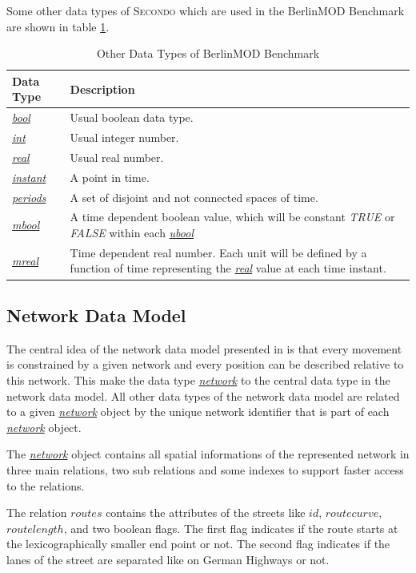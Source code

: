 \documentclass[a4paper]{article}
\newcommand{\secondo}{\textsc{Secondo}}
\newcommand{\bmodb} {BerlinMOD Benchmark}
\newcommand{\dt}[1]{\textsl{\underline{#1}}}
\newcommand{\true}{\textsl{TRUE}}
\newcommand{\false}{\textsl{FALSE}}
\begin{document}
Some other data types of \secondo{} which are used in the \bmodb{} are shown in
table \ref{tab:bmodbdatatypes}.
\begin{table}[H]
\begin{center}
\begin{scriptsize}
\begin{tabularx}{\textwidth}{|l|X|}
\hline
\textbf{Data Type} & \textbf{Description} \\
\hline
\dt{bool} & Usual boolean data type.\\
\hline
\dt{int} & Usual integer number.\\
\hline
\dt{real} & Usual real number.\\
\hline
\dt{instant} & A point in time.\\
\hline
\dt{periods} & A set of disjoint and not connected spaces of time.\\
\hline
\dt{mbool} & A time dependent boolean value, which will be constant \true{} or \false{}
within each \dt{ubool} \\
\hline
\dt{mreal} & Time dependent real number. Each unit will be defined by a function
of time representing the \dt{real} value at each time instant.\\
\hline
\end{tabularx}
\end{scriptsize}
\caption{Other Data Types of \bmodb{}}
\label{tab:bmodbdatatypes}
\end{center}
\end{table}
\subsection{Network Data Model}
\label{sec:netdatamod}
The central idea of the network data model presented in \cite{1146465} is that
every movement is constrained by a given network and every position can be described
relative to this network. This make the data type \dt{network} to the central
data type in the network data model. All other data types of the network data model
are related to a given \dt{network} object by the unique network identifier that
is part of each \dt{network} object.

The \dt{network} object contains all spatial informations of the represented network
in three main relations, two sub relations and some indexes to support faster
access to the relations.

The relation $routes$ contains the attributes of the
streets like $id$, $route curve$, $route length$, and two boolean flags. The first
flag indicates if the route starts at the lexicographically smaller end point or not.
The second flag indicates if the lanes of the street are separated like on German
Highways or not.
\end{document}
